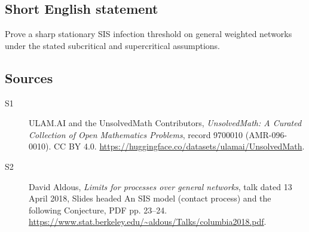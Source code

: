 \documentclass[11pt]{article}
\begin{document}
\subsection{Short English statement}
Prove a sharp stationary SIS infection threshold on general weighted networks under the stated subcritical and supercritical assumptions.
\subsection{Sources}
\begin{description}
\item[\hypertarget{source:9700010:1}{S1}] ULAM.AI and the UnsolvedMath Contributors, \emph{UnsolvedMath: A Curated Collection of Open Mathematics Problems}, record 9700010 (AMR-096-0010). CC BY 4.0. \url{https://huggingface.co/datasets/ulamai/UnsolvedMath}.
\item[\hypertarget{source:9700010:2}{S2}] David Aldous, \emph{Limits for processes over general networks}, talk dated 13 April 2018, Slides headed An SIS model (contact process) and the following Conjecture, PDF pp. 23--24. \url{https://www.stat.berkeley.edu/~aldous/Talks/columbia2018.pdf}.
\end{description}
\label{end:9700010}
\end{document}
